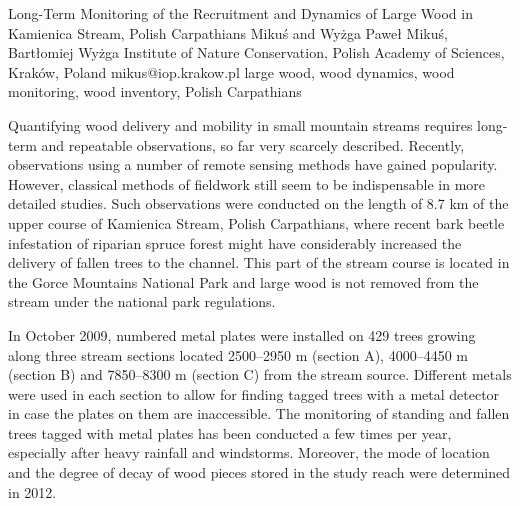 \abstract
{Long-Term Monitoring of the Recruitment and Dynamics of Large Wood in Kamienica Stream, Polish Carpathians} %
{Mikuś and Wyżga} %
{Paweł Mikuś, Bartłomiej Wyżga} %
{\TLtag} %
{Institute of Nature Conservation, Polish Academy of Sciences, Kraków, Poland
} %
{mikus@iop.krakow.pl}  %
{large wood, wood dynamics, wood monitoring, wood inventory, Polish Carpathians}%
{Quantifying wood delivery and mobility in small mountain streams requires long-term and repeatable observations, so far very scarcely described. Recently, observations using a number of remote sensing methods have gained popularity. However, classical methods of fieldwork still seem to be indispensable in more detailed studies. Such observations were conducted on the length of 8.7 km of the upper course of Kamienica Stream, Polish Carpathians, where recent bark beetle infestation of riparian spruce forest might have considerably increased the delivery of fallen trees to the channel. This part of the stream course is located in the Gorce Mountains National Park and large wood is not removed from the stream under the national park regulations.

In October 2009, numbered metal plates were installed on 429 trees growing along three stream sections located 2500–2950 m (section A), 4000–4450 m (section B) and 7850–8300 m (section C) from the stream source. Different metals were used in each section to allow for finding tagged trees with a metal detector in case the plates on them are inaccessible. The monitoring of standing and fallen trees tagged with metal plates has been conducted a few times per year, especially after heavy rainfall and windstorms. Moreover, the mode of location and the degree of decay of wood pieces stored in the study reach were determined in 2012.

}
